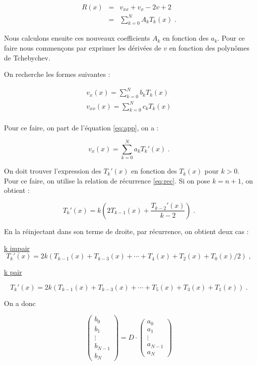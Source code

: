 \documentclass{report}
\begin{document}
\begin{eqnarray}
R(x) & = & v_{xx} + v_x - 2v + 2 \\
& = & \sum_{k=0}^N A_{k} T_{k}(x)\;. \label{eq:reste}
\end{eqnarray}

Nous calculons ensuite ces nouveaux coefficients $A_{k}$ en fonction des $a_{k}$. Pour ce faire nous commençons par exprimer les dérivées de $v$ en fonction des polynômes de Tchebychev.

On recherche les formes suivantes : 

\begin{eqnarray}
v_{x}(x) = \sum_{k=0}^N b_k T_k(x) \label{eq:vxb}\\
v_{xx}(x) = \sum_{k=0}^N c_k T_k(x) \\
\end{eqnarray}

Pour ce faire, on part de l'équation \eqref{eq:app}, on a :

\begin{equation}
v_{x}(x) = \sum_{k=0}^N a_k T_{k}'(x)\;.\label{eq:vxa}
\end{equation}

On doit trouver l'expression des $T_{k}'(x)$ en fonction des $T_{k}(x)$ pour $k>0$. Pour ce faire, on utilise la relation de récurrence \eqref{eq:rec}. Si on pose $k=n+1$, on obtient :

\begin{equation}
T_{k}'(x)  = k\left(2T_{k-1}(x)+\frac{T_{k-2}'(x)}{k-2}\right)\;.
\end{equation}

En la réinjectant dans son terme de droite, par récurrence, on obtient deux cas :

\underline{k impair}
\begin{equation}
T_{k}'(x)  = 2k\left(T_{k-1}(x)+T_{k-3}(x)+\cdots+T_{4}(x)+T_{2}(x)+T_{0}(x)/2\right)\;,\label{eq:kimpair}
\end{equation}

\underline{k pair} 

\begin{equation}
T_{k}'(x)  = 2k\left(T_{k-1}(x)+T_{k-3}(x)+\cdots+T_{5}(x)+T_{3}(x)+T_{1}(x)\right)\;.\label{eq:kpair}
\end{equation}

On a donc

\begin{equation}
\begin{pmatrix}
 b_{0}\\ 
 b_{1}\\ 
 \vdots\\ 
 b_{N-1}\\ 
 b_{N}
\end{pmatrix} 
= D \cdot \begin{pmatrix}
 a_0\\ 
 a_1\\ 
 \vdots\\ 
 a_{N-1}\\ 
 a_{N}
\end{pmatrix}
\end{equation}
\end{document}
